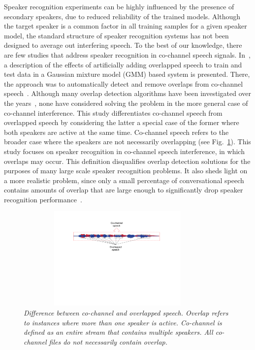 \documentclass[journal]{IEEEtran}
\begin{document}
Speaker recognition experiments can be highly influenced by the presence of secondary speakers, due to reduced reliability of the trained models. 
Although the target speaker is a common factor in all training samples for a given speaker model, the standard structure of speaker recognition systems has not been designed to average out interfering speech. 
To the best of our knowledge, there are few studies that address speaker recognition in co-channel speech signals. 
In~\cite{yantorno_report,yantorno_SID}, a description of the effects of artificially adding overlapped speech to train and test data in a Gaussian mixture model (GMM) based system is presented. 
There, the approach was to automatically detect and remove overlaps from co-channel speech~\cite{yantorno_SID}. 
Although many overlap detection algorithms have been investigated over the years~\cite{Boakye_icassp_08,nav_icassp13,smolenski_tut,sapvr_2000}, none have considered solving the problem in the more general case of co-channel interference. 
This study differentiates co-channel speech from overlapped speech by considering the latter a special case of the former where both speakers are active at the same time. 
Co-channel speech refers to the broader case where the speakers are not necessarily overlapping (see Fig.~\ref{fig:cochannel_vs_overlap}). 
This study focuses on speaker recognition in co-channel speech interference, in which overlaps may occur.  
This definition disqualifies overlap detection solutions for the purposes of many large scale speaker recognition problems. 
It also sheds light on a more realistic problem, since only a small percentage of conversational speech contains amounts of overlap that are large enough to significantly drop speaker recognition performance~\cite{cetin_shriberg_06_icassp,smolenski_tut}. 

\begin{figure}[t!]
	\centering
	\vspace{0mm}
	\includegraphics[height = 2in, width=0.9\textwidth]{figures/cochannel_vs_overlap-crop}
	\vspace{-3mm}
	\caption{\it \small Difference between co-channel and overlapped speech. Overlap refers to instances where more than one speaker is active. Co-channel is defined as an entire stream that contains multiple speakers. All co-channel files do not necessarily contain overlap. }
	\label{fig:cochannel_vs_overlap}
	\vspace{-3mm}
\end{figure}
\end{document}
